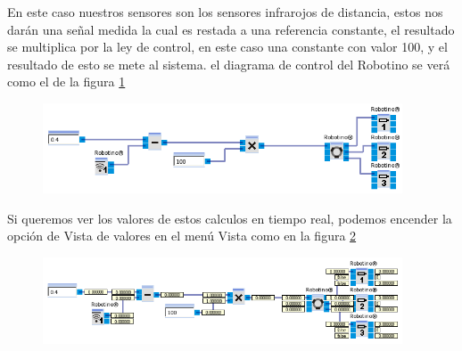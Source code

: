 \begin{frame}
		En este caso nuestros sensores son los sensores infrarojos de distancia, estos nos darán una señal medida la cual es restada a una referencia constante, el resultado se multiplica por la ley de control, en este caso una constante con valor 100, y el resultado de esto se mete al sistema. el diagrama de control del Robotino se verá como el de la figura \ref{fig:control-01}
		\begin{figure}
			\begin{center}
				\includegraphics[width=0.95\textwidth]{images/05-control/01.png}
				\label{fig:control-01}
			\end{center}
		\end{figure}
\end{frame}

\begin{frame}
		Si queremos ver los valores de estos calculos en tiempo real, podemos encender la opción de Vista de valores en el menú Vista como en la figura \ref{fig:control-02}
		\begin{figure}
			\begin{center}
				\includegraphics[width=0.95\textwidth]{images/05-control/02.png}
				\label{fig:control-02}
			\end{center}
		\end{figure}
\end{frame}

